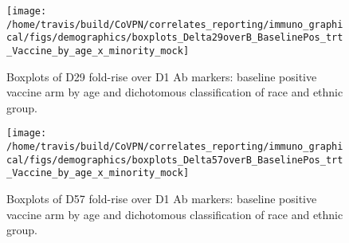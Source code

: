\documentclass[]{book}
\theoremstyle{definition}
\theoremstyle{definition}
\theoremstyle{definition}
\newcommand{\1}{\mathbbm{1}}
\begin{document}
\begin{figure}[H]

{\centering \texttt{[image: /home/travis/build/CoVPN/correlates\_reporting/immuno\_graphical/figs/demographics/boxplots\_Delta29overB\_BaselinePos\_trt\_Vaccine\_by\_age\_x\_minority\_mock]} 

}

\caption{Boxplots of D29 fold-rise over D1 Ab markers: baseline positive vaccine arm by age and dichotomous classification of race and ethnic group.}\label{fig:unnamed-chunk-198}
\end{figure}

\begin{figure}[H]

{\centering \texttt{[image: /home/travis/build/CoVPN/correlates\_reporting/immuno\_graphical/figs/demographics/boxplots\_Delta57overB\_BaselinePos\_trt\_Vaccine\_by\_age\_x\_minority\_mock]} 

}

\caption{Boxplots of D57 fold-rise over D1 Ab markers: baseline positive vaccine arm by age and dichotomous classification of race and ethnic group.}\label{fig:unnamed-chunk-199}
\end{figure}


\end{document}
